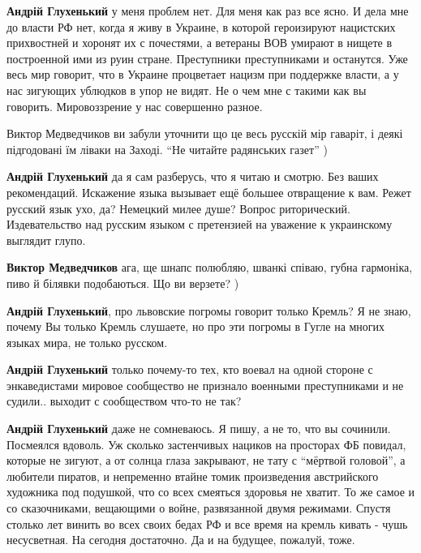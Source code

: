 \begin{itemize}
\begin{itemize}
\textbf{Андрій Глухенький} у меня проблем нет. Для меня как раз все ясно. И
дела мне до власти РФ нет, когда я живу в Украине, в которой героизируют
нацистских прихвостней и хоронят их с почестями, а ветераны ВОВ умирают в
нищете в построенной ими из руин стране. Преступники преступниками и останутся.
Уже весь мир говорит, что в Украине процветает нацизм при поддержке власти, а у
нас зигующих ублюдков в упор не видят. Не о чем мне с такими как вы говорить.
Мировоззрение у нас совершенно разное.


Виктор Медведчиков ви забули уточнити що це весь русскій мір гаваріт, і деякі
підгодовані їм ліваки на Заході. \enquote{Не читайте радянських газет} )


\textbf{Андрій Глухенький} да я сам разберусь, что я читаю и смотрю. Без ваших
рекомендаций. Искажение языка вызывает ещё большее отвращение к вам. Режет
русский язык ухо, да? Немецкий милее душе? Вопрос риторический. Издевательство
над русским языком с претензией на уважение к украинскому выглядит глупо.

\textbf{Виктор Медведчиков} ага, ще шнапс полюбляю, шванкі співаю, губна гармоніка, пиво й білявки подобаються. Що ви верзете? )


\textbf{Андрій Глухенький}, про львовские погромы говорит только Кремль? Я не
знаю, почему Вы только Кремль слушаете, но про эти погромы в Гугле на многих
языках мира, не только русском.


\textbf{Андрій Глухенький} только почему-то тех, кто воевал на одной стороне с
энкаведистами мировое сообщество не признало военными преступниками и не
судили.. выходит с сообществом что-то не так?


\textbf{Андрій Глухенький} даже не сомневаюсь. Я пишу, а не то, что вы
сочинили. Посмеялся вдоволь. Уж сколько застенчивых нациков на просторах ФБ
повидал, которые не зигуют, а от солнца глаза закрывают, не тату с \enquote{мёртвой
головой}, а любители пиратов, и непременно втайне томик произведения
австрийского художника под подушкой, что со всех смеяться здоровья не хватит.
То же самое и со сказочниками, вещающими о войне, развязанной двумя режимами.
Спустя столько лет винить во всех своих бедах РФ и все время на кремль кивать -
чушь несусветная. На сегодня достаточно. Да и на будущее, пожалуй, тоже.


\end{itemize}
\end{itemize}
